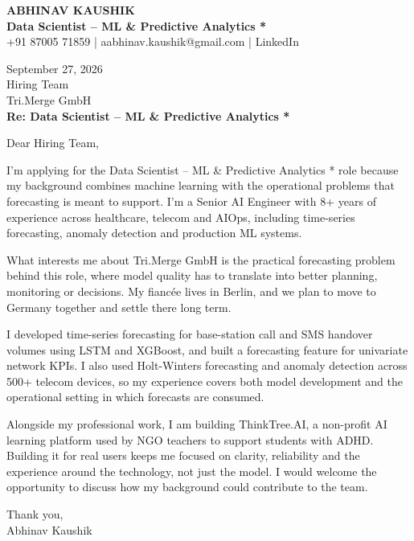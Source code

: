 \documentclass[10pt,a4paper]{article}
\begin{document}
\begin{center}
{\Large\bfseries ABHINAV KAUSHIK}\\[2pt]
{\bfseries Data Scientist – ML \& Predictive Analytics *}\\[2pt]
+91 87005 71859 \quad | \quad aabhinav.kaushik@gmail.com \quad | \quad LinkedIn
\end{center}
\vspace{8pt}
September 27, 2026\\[6pt]
Hiring Team\\
Tri.Merge GmbH\\[4pt]
\textbf{Re: Data Scientist – ML \& Predictive Analytics *}

Dear Hiring Team,

I’m applying for the Data Scientist – ML \& Predictive Analytics * role because my background combines machine learning with the operational problems that forecasting is meant to support. I’m a Senior AI Engineer with 8+ years of experience across healthcare, telecom and AIOps, including time-series forecasting, anomaly detection and production ML systems.

What interests me about Tri.Merge GmbH is the practical forecasting problem behind this role, where model quality has to translate into better planning, monitoring or decisions. My fiancée lives in Berlin, and we plan to move to Germany together and settle there long term.

I developed time-series forecasting for base-station call and SMS handover volumes using LSTM and XGBoost, and built a forecasting feature for univariate network KPIs. I also used Holt-Winters forecasting and anomaly detection across 500+ telecom devices, so my experience covers both model development and the operational setting in which forecasts are consumed.

Alongside my professional work, I am building ThinkTree.AI, a non-profit AI learning platform used by NGO teachers to support students with ADHD. Building it for real users keeps me focused on clarity, reliability and the experience around the technology, not just the model. I would welcome the opportunity to discuss how my background could contribute to the team.

Thank you,\\
Abhinav Kaushik
\end{document}
